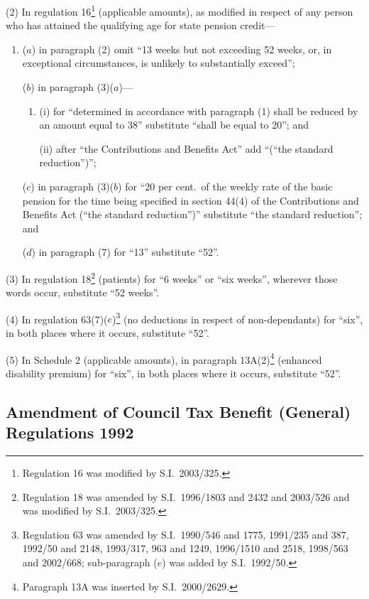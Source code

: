 \documentclass[12pt,a4paper]{article}
\begin{document}
(2) In regulation 16\footnote{Regulation 16 was modified by S.I.\ 2003/325.} (applicable amounts), as modified in respect of any person who has attained the qualifying age for state pension credit—
\begin{enumerate}\item[]
($a$) in paragraph (2) omit “13 weeks but not exceeding 52 weeks, or, in exceptional circumstances, is unlikely to substantially exceed”;

($b$) in paragraph (3)($a$)—
\begin{enumerate}\item[]
(i) for “determined in accordance with paragraph (1) shall be reduced by an amount equal to 38” substitute “shall be equal to 20”; and

(ii) after “the Contributions and Benefits Act” add “(“the standard reduction”)”;
\end{enumerate}

($c$) in paragraph (3)($b$)  for “20 per cent.\ of the weekly rate of the basic pension for the time being specified in section 44(4) of the Contributions and Benefits Act (“the standard reduction”)” substitute “the standard reduction”; and

($d$) in paragraph (7) for “13” substitute “52”.
\end{enumerate}

(3) In regulation 18\footnote{Regulation 18 was amended by S.I.\ 1996/1803 and 2432 and 2003/526 and was modified by S.I.\ 2003/325.} (patients) for “6 weeks” or “six weeks”, wherever those words occur, substitute “52 weeks”.

(4) In regulation 63(7)($e$)\footnote{Regulation 63 was amended by S.I.\ 1990/546 and 1775, 1991/235 and 387, 1992/50 and 2148, 1993/317, 963 and 1249, 1996/1510 and 2518, 1998/563 and 2002/668; sub-paragraph ($e$) was added by S.I.\ 1992/50.} (no deductions in respect of non-dependants) for “six”, in both places where it occurs, substitute “52”.

(5) In Schedule 2 (applicable amounts), in paragraph 13A(2)\footnote{Paragraph 13A was inserted by S.I.\ 2000/2629.} (enhanced disability premium) for “six”, in both places where it occurs, substitute “52”.

\subsection[5. Amendment of Council Tax Benefit (General) Regulations 1992]{\sloppy Amendment of Council Tax Benefit (General) Regulations 1992}
\end{document}
